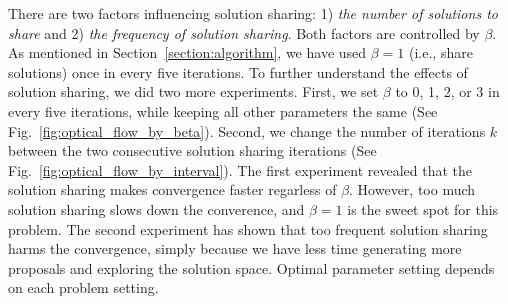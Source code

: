 There are two factors influencing solution sharing: 1) \textit{the
number of solutions to share} and 2) \textit{the frequency of solution
sharing}. Both factors are controlled by $\beta$. As mentioned in
Section~\ref{section:algorithm}, we have used $\beta = 1$ (i.e., share
solutions) once in every five iterations.  To further understand the
effects of solution sharing, we did two more experiments. First, we set
$\beta$ to 0, 1, 2, or 3 in every five iterations,
while keeping all other parameters the same (See
Fig.~\ref{fig:optical_flow_by_beta}).  Second, we change the number of
iterations $k$ between the two consecutive solution sharing iterations
(See Fig.~\ref{fig:optical_flow_by_interval}).  The first experiment
revealed that the solution sharing makes convergence faster regarless of
$\beta$.  However, too much solution sharing slows down the converence,
and $\beta=1$ is the sweet spot for this problem.
%
%
The second experiment has shown that too frequent solution sharing
harms the convergence, simply because we have less time generating more
proposals and exploring the solution space.
Optimal parameter setting depends on each problem setting.
